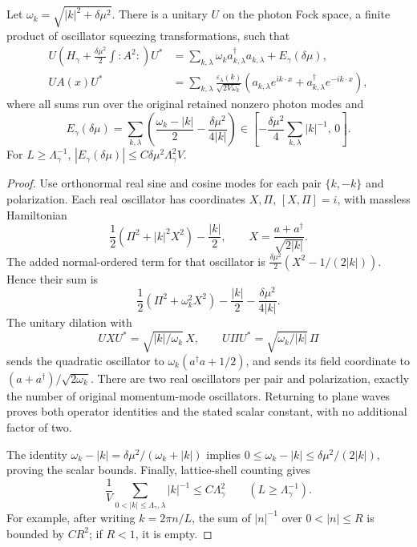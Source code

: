 \begin{lemma}
\label{lem:proca}
Let \(\omega_k=\sqrt{|k|^2+\delta\mu^2}\). There is a unitary \(U\) on the
photon Fock space, a finite product of oscillator squeezing transformations,
such that
\begin{align}
 U\left(H_\gamma+\frac{\delta\mu^2}{2}\int:\!A^2\!:\right)U^*
 &=\sum_{k,\lambda}\omega_k a^\dagger_{k,\lambda}a_{k,\lambda}
   +E_\gamma(\delta\mu),
 \label{eq:proca-H}\\
 U A(x)U^*
 &=\sum_{k,\lambda}\frac{\varepsilon_\lambda(k)}{\sqrt{2V\omega_k}}
 \left(a_{k,\lambda}e^{ik\cdot x}+a^\dagger_{k,\lambda}e^{-ik\cdot x}\right),
 \label{eq:proca-A}
\end{align}
where all sums run over the original retained nonzero photon modes and
\begin{equation}
 E_\gamma(\delta\mu)
 =\sum_{k,\lambda}
 \left(\frac{\omega_k-|k|}{2}-\frac{\delta\mu^2}{4|k|}\right)
 \in\left[-\frac{\delta\mu^2}{4}\sum_{k,\lambda}|k|^{-1},\,0\right].
 \label{eq:proca-const}
\end{equation}
For \(L\geq\Lambda_\gamma^{-1}\),
\( |E_\gamma(\delta\mu)|\leq C\delta\mu^2\Lambda_\gamma^2V\).
\end{lemma}
\begin{proof}
Use orthonormal real sine and cosine modes for each pair \(\{k,-k\}\)
and polarization. Each real oscillator has coordinates \(X,\Pi\),
\([X,\Pi]=i\), with massless Hamiltonian
\[
 \frac12(\Pi^2+|k|^2X^2)-\frac{|k|}{2},
 \qquad X=\frac{a+a^\dagger}{\sqrt{2|k|}}.
\]
The added normal-ordered term for that oscillator is
\(\frac{\delta\mu^2}{2}(X^2-1/(2|k|))\). Hence their sum is
\[
 \frac12(\Pi^2+\omega_k^2X^2)
 -\frac{|k|}{2}-\frac{\delta\mu^2}{4|k|}.
\]
The unitary dilation with
\[
 UXU^*=\sqrt{|k|/\omega_k}\,X,
 \qquad U\Pi U^*=\sqrt{\omega_k/|k|}\,\Pi
\]
sends the quadratic oscillator to
\(\omega_k(a^\dagger a+1/2)\), and sends its field coordinate to
\((a+a^\dagger)/\sqrt{2\omega_k}\). There are two real oscillators per
pair and polarization, exactly the number of original momentum-mode
oscillators. Returning to plane waves proves both operator identities and
the stated scalar constant, with no additional factor of two.

The identity
\(\omega_k-|k|=\delta\mu^2/(\omega_k+|k|)\) implies
\(0\leq\omega_k-|k|\leq\delta\mu^2/(2|k|)\), proving the scalar bounds.
Finally, lattice-shell counting gives
\[
 \frac1V\sum_{0<|k|\leq\Lambda_\gamma,\lambda}|k|^{-1}
 \leq C\Lambda_\gamma^2
 \qquad (L\geq\Lambda_\gamma^{-1}).
\]
For example, after writing \(k=2\pi n/L\), the sum of \(|n|^{-1}\)
over \(0<|n|\leq R\) is bounded by \(CR^2\); if \(R<1\), it is empty.
\end{proof}


